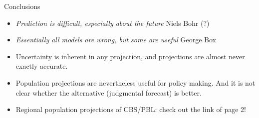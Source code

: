 \documentclass[final, 12pt, aspectratio=169, xcolor={dvipsnames}]{beamer}
\begin{document}
\begin{frame}{Conclusions}  
  \begin{itemize}
  \item \textit{Prediction is difficult, especially about the future} Niels Bohr (?)
  \item \textit{Essentially all models are wrong, but some are useful} George Box
  \item Uncertainty is inherent in any projection, and projections are almost never exactly accurate.
  \item Population projections are nevertheless useful for policy making. And it is not clear whether the alternative (judgmental forecast) is better.
  \item Regional population projections of CBS/PBL: check out the link of page 2!

    \end{itemize}
\end{frame}
\end{document}
